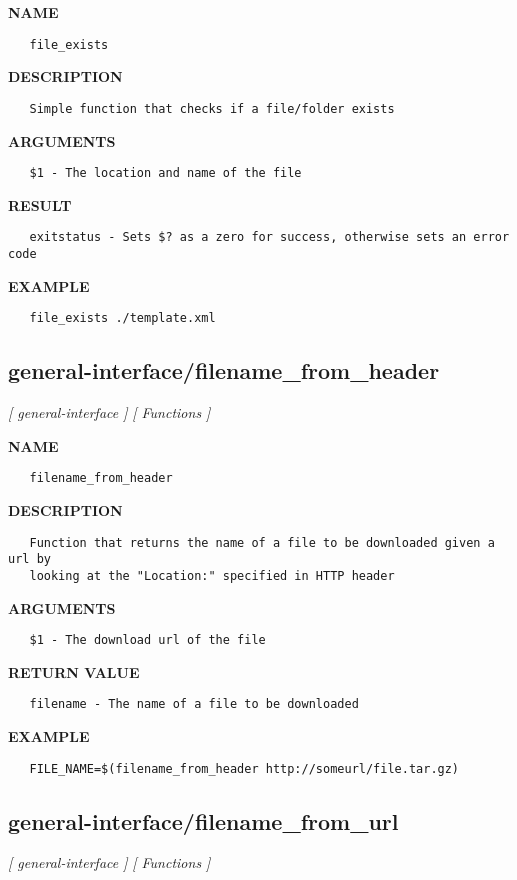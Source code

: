 \label{ch:robo28}
\label{ch:general_interface_file_exists}
\textbf{NAME}
\begin{verbatim}
   file_exists
\end{verbatim}
\textbf{DESCRIPTION}
\begin{verbatim}
   Simple function that checks if a file/folder exists
\end{verbatim}
\textbf{ARGUMENTS}
\begin{verbatim}
   $1 - The location and name of the file
\end{verbatim}
\textbf{RESULT}
\begin{verbatim}
   exitstatus - Sets $? as a zero for success, otherwise sets an error code
\end{verbatim}
\textbf{EXAMPLE}
\begin{verbatim}
   file_exists ./template.xml
\end{verbatim}
\newpage
\subsection{general-interface/filename\_from\_header}
\textsl{[ general-interface ]}
\textsl{[ Functions ]}

\label{ch:robo29}
\label{ch:general_interface_filename_from_header}
\textbf{NAME}
\begin{verbatim}
   filename_from_header
\end{verbatim}
\textbf{DESCRIPTION}
\begin{verbatim}
   Function that returns the name of a file to be downloaded given a url by
   looking at the "Location:" specified in HTTP header
\end{verbatim}
\textbf{ARGUMENTS}
\begin{verbatim}
   $1 - The download url of the file
\end{verbatim}
\textbf{RETURN VALUE}
\begin{verbatim}
   filename - The name of a file to be downloaded
\end{verbatim}
\textbf{EXAMPLE}
\begin{verbatim}
   FILE_NAME=$(filename_from_header http://someurl/file.tar.gz)
\end{verbatim}
\newpage
\subsection{general-interface/filename\_from\_url}
\textsl{[ general-interface ]}
\textsl{[ Functions ]}

